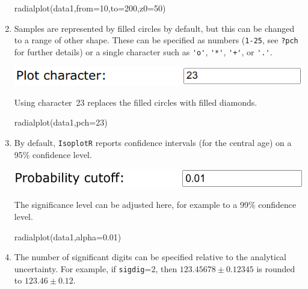 \begin{refsection}
\begin{enumerate}
\begin{console}
radialplot(data1,from=10,to=200,z0=50)
\end{console}

\item Samples are represented by filled circles by default, but this
  can be changed to a range of other shape. These can be specified as
  numbers (\texttt{1-25}, see \texttt{?pch} for further details) or a
  single character such as \verb|'o'|, \verb|'*'|, \verb|'+'|, or
  \verb|'.'|. 

\noindent\begin{minipage}[t]{.5\linewidth}
\strut\vspace*{-\baselineskip}\newline
\includegraphics[width=\linewidth]{../figures/OtherRadialPCH.png}
\end{minipage}
\begin{minipage}[t]{.5\linewidth}
Using character~23 replaces the filled circles with filled diamonds.
\end{minipage}

\begin{console}
radialplot(data1,pch=23)
\end{console}
  
\item By default, \texttt{IsoplotR} reports confidence intervals (for
  the central age) on a 95\% confidence level.

\noindent\begin{minipage}[t]{.5\linewidth}
\strut\vspace*{-\baselineskip}\newline
\includegraphics[width=\linewidth]{../figures/OtherRadialAlpha.png}
\end{minipage}
\begin{minipage}[t]{.5\linewidth}
The significance level can be adjusted here, for example to a 99\%
confidence level.
\end{minipage}

\begin{console}
radialplot(data1,alpha=0.01)
\end{console}

\item The number of significant digits can be specified relative to
  the analytical uncertainty. For example, if \texttt{sigdig}=2, then
  $123.45678 \pm 0.12345$ is rounded to $123.46 \pm 0.12$.


\end{enumerate}
\end{refsection}
